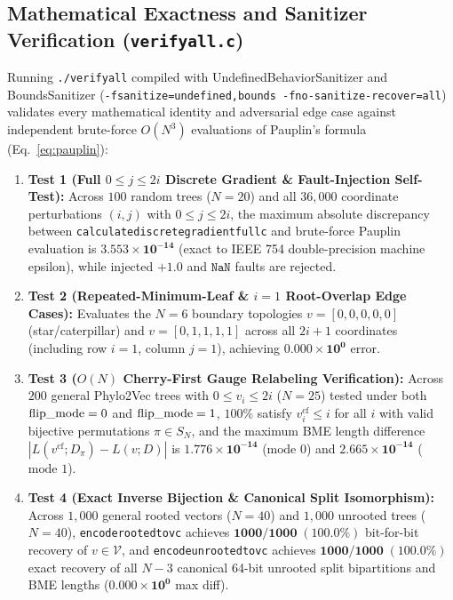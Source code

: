 \documentclass[11pt,a4paper]{article}
\makeatletter
\DeclareRobustCommand{\_}{\ifmmode\nfss@text{\textunderscore}\else\textunderscore\allowbreak\fi}
\theoremstyle{definition}
\makeatother
\begin{document}
\subsection{Mathematical Exactness and Sanitizer Verification (\texttt{verify\_all.c})}
Running \texttt{./verify\_all} compiled with Undefined\-Behavior\-Sanitizer and Bounds\-Sanitizer (\texttt{-fsanitize=undefined,bounds -fno-sanitize-recover=all}) validates every mathematical identity and adversarial edge case against independent brute-force $O(N^3)$ evaluations of Pauplin's formula (Eq.~\eqref{eq:pauplin}):
\begin{enumerate}
    \item \textbf{Test 1 (Full $0 \le j \le 2i$ Discrete Gradient \& Fault-Injection Self-Test):} Across $100$ random trees ($N = 20$) and all $36{,}000$ coordinate perturbations $(i, j)$ with $0 \le j \le 2i$, the maximum absolute discrepancy between \texttt{calculate\_discrete\_gradient\_full\_c} and brute-force Pauplin evaluation is $\mathbf{3.553 \times 10^{-14}}$ (exact to IEEE 754 double-precision machine epsilon), while injected $+1.0$ and $\texttt{NaN}$ faults are rejected.
    \item \textbf{Test 2 (Repeated-Minimum-Leaf \& $i=1$ Root-Overlap Edge Cases):} Evaluates the $N=6$ boundary topologies $v = [0, 0, 0, 0, 0]$ (star/caterpillar) and $v = [0, 1, 1, 1, 1]$ across all $2i+1$ coordinates (including row $i=1$, column $j=1$), achieving $\mathbf{0.000 \times 10^{0}}$ error.
    \item \textbf{Test 3 ($O(N)$ Cherry-First Gauge Relabeling Verification):} Across $200$ general Phylo2Vec trees with $0 \le v_i \le 2i$ ($N = 25$) tested under both $\text{flip\_mode} = 0$ and $\text{flip\_mode} = 1$, $100\%$ satisfy $v^{\text{cf}}_i \le i$ for all $i$ with valid bijective permutations $\pi \in S_N$, and the maximum BME length difference $|L(v^{\text{cf}}; D_\pi) - L(v; D)|$ is $\mathbf{1.776 \times 10^{-14}}$ ($\text{mode } 0$) and $\mathbf{2.665 \times 10^{-14}}$ ($\text{mode } 1$).
    \item \textbf{Test 4 (Exact Inverse Bijection \& Canonical Split Isomorphism):} Across $1{,}000$ general rooted vectors ($N = 40$) and $1{,}000$ unrooted trees ($N = 40$), \texttt{encode\_rooted\_to\_v\_c} achieves $\mathbf{1000 / 1000 \; (100.0\%)}$ bit-for-bit recovery of $v \in \mathcal{V}$, and \texttt{encode\_unrooted\_to\_v\_c} achieves $\mathbf{1000 / 1000 \; (100.0\%)}$ exact recovery of all $N-3$ canonical 64-bit unrooted split bipartitions and BME lengths ($\mathbf{0.000 \times 10^{0}}$ max diff).

\end{enumerate}
\end{document}

